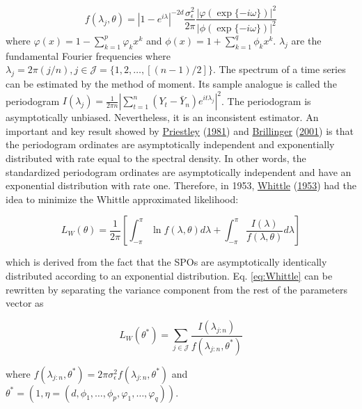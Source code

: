 \documentclass[
  11pt,
]{article}
\begin{document}
\[
f(\lambda_j, \theta)=\left|1-e^{i \lambda}\right|^{-2 d}\frac{\sigma_{\epsilon}^{2}}{2 \pi} \frac{|\varphi(\exp \{-i \omega\})|^{2}}{|\phi(\exp \{-i \omega\})|^{2}}
\] where \(\varphi(x)=1-\sum_{k=1}^{p} \varphi_{k} x^{k}\) and
\(\phi(x)=1+\sum_{k=1}^{q} \phi_{k} x^{k}\). \(\lambda_j\) are the
fundamental Fourier frequencies where
\(\lambda_j=2 \pi(j / n), j \in \mathcal{J}=\{1,2, \ldots,[(n-1) / 2]\}\).
The spectrum of a time series can be estimated by the method of moment.
Its sample analogue is called the periodogram
\(I\left(\lambda_{j}\right)=\frac{1}{2 \pi n}\left|\sum_{t=1}^{n}\left(Y_{t}-\bar{Y}_{n}\right) e^{i t \lambda_{j}}\right|^{2}\).
The periodogram is asymptotically unbiased. Nevertheless, it is an
inconsistent estimator. An important and key result showed by
\protect\hyperlink{ref-priestley1981spectral}{Priestley}
(\protect\hyperlink{ref-priestley1981spectral}{1981}) and
\protect\hyperlink{ref-brillinger2001time}{Brillinger}
(\protect\hyperlink{ref-brillinger2001time}{2001}) is that the
periodogram ordinates are asymptotically independent and exponentially
distributed with rate equal to the spectral density. In other words, the
standardized periodogram ordinates are asymptotically independent and
have an exponential distribution with rate one. Therefore, in 1953,
\protect\hyperlink{ref-whittle1953estimation}{Whittle}
(\protect\hyperlink{ref-whittle1953estimation}{1953}) had the idea to
minimize the Whittle approximated likelihood:

\begin{equation}
L_{W}(\theta)=\frac{1}{2 \pi}\left[\int_{-\pi}^{\pi} \ln f(\lambda, \theta) d \lambda+\int_{-\pi}^{\pi} \frac{I(\lambda)}{f(\lambda, \theta)} d \lambda\right]
\label{eq:Whittle}
\end{equation}

which is derived from the fact that the SPOs are asymptotically
identically distributed according to an exponential distribution. Eq.
\ref{eq:Whittle} can be rewritten by separating the variance component
from the rest of the parameters vector as

\begin{equation}
L_{W}\left(\theta^{*}\right)=\sum_{j \in \mathcal{J}} \frac{I\left(\lambda_{j: n}\right)}{f\left(\lambda_{j: n}, \theta^{*}\right)}
\end{equation}

where
\(f\left(\lambda_{j: n}, \theta^{*}\right)=2 \pi \sigma_{\epsilon}^{2} f\left(\lambda_{j: n}, \theta^{*}\right)\)
and
\(\theta^{*}=(1, \eta = \left(d, \phi_{1}, \ldots, \phi_{p}, \varphi_{1}, \ldots, \varphi_{q}\right))\).
\end{document}
